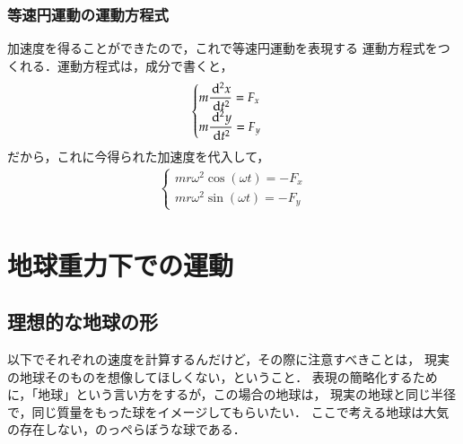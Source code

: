             \subsubsection{等速円運動の運動方程式}
                    加速度を得ることができたので，これで等速円運動を表現する
                    運動方程式をつくれる．運動方程式は，成分で書くと，
                        \begin{align*}
                            \begin{cases}
                            \displaystyle m\frac{\,\mathrm{d}^{2} x}{\,\mathrm{d} t^{2}} = F_{x} \\
                            \displaystyle m\frac{\,\mathrm{d}^{2} y}{\,\mathrm{d} t^{2}} = F_{y}
                            \end{cases}
                        \end{align*}
                    だから，これに今得られた加速度を代入して，
                        \begin{align}
                            \begin{cases}
                            \displaystyle mr\omega^{2} \cos(\omega t) = -F_{x} \\
                            \displaystyle mr\omega^{2} \sin(\omega t) = -F_{y}
                            \end{cases}
                        \end{align}

    \section{地球重力下での運動}
        \subsection{理想的な地球の形}
            以下でそれぞれの速度を計算するんだけど，その際に注意すべきことは，
            現実の地球そのものを想像してほしくない，ということ．
            表現の簡略化するために，「地球」という言い方をするが，この場合の地球は，
            現実の地球と同じ半径で，同じ質量をもった球をイメージしてもらいたい．
            ここで考える地球は大気の存在しない，のっぺらぼうな球である．

